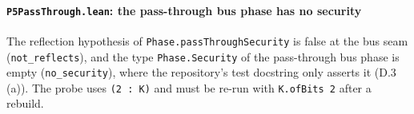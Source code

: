 \paragraph{\texttt{P5PassThrough.lean}: the pass-through bus phase has no security}\label{sec:gen-probe-spine-P5PassThrough}

The reflection hypothesis of \texttt{Phase.\allowbreak{}passThroughSecurity} is false at the bus seam (\texttt{not\_\allowbreak{}reflects}), and the type \texttt{Phase.\allowbreak{}Security} of the pass-through bus phase is empty (\texttt{no\_\allowbreak{}security}), where the repository's test docstring only asserts it (D.3 (a)). The probe uses \texttt{(\allowbreak{}2 : K)} and must be re-run with \texttt{K.\allowbreak{}ofBits 2} after a rebuild.


